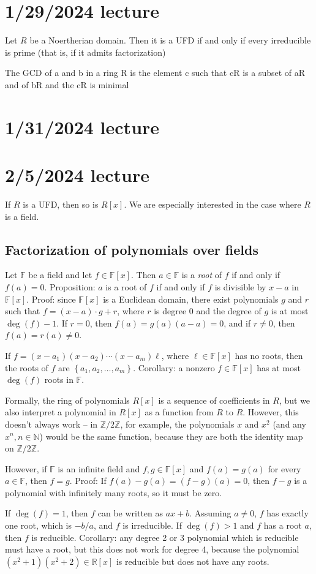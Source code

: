 \documentclass[12pt]{article}
\begin{document}
\section{1/29/2024 lecture}
Let $R$ be a Noertherian domain. Then it is a UFD if and only if every irreducible is prime (that is, if it admits factorization)
\par
The GCD of a and b in a ring R is the element c such that cR is a subset of aR and of bR and the cR is minimal
\section{1/31/2024 lecture}

\section{2/5/2024 lecture}
If $R$ is a UFD, then so is $R[x]$. We are especially interested in the case where $R$ is a field.
\subsection{Factorization of polynomials over fields}
Let $\mathbb{F}$ be a field and let $f \in \mathbb{F}[x]$. Then $a \in \mathbb{F}$ is a \textit{root} of $f$ if and only if $f(a)=0$. Proposition: $a$ is a root of $f$ if and only if $f$ is divisible by $x-a$ in $\mathbb{F}[x]$. Proof: since $\mathbb{F}[x]$ is a Euclidean domain, there exist polynomials $g$ and $r$ such that $f=(x-a)\cdot g + r$, where $r$ is degree 0 and the degree of $g$ is at most $\operatorname{deg}(f)-1$. If $r=0$, then $f(a)=g(a)(a-a)=0$, and if $r \neq 0$, then $f(a)=r(a)\neq0$.
\par
If $f = (x-a_1)(x-a_2)\cdots (x-a_m) \ell$, where $\ell \in \mathbb{F}[x]$ has no roots, then the roots of $f$ are $ \left\{ a_1, a_2, \dots, a_m \right\}$. Corollary: a nonzero $f \in \mathbb{F}[x]$ has at most $\operatorname{deg}(f)$ roots in $\mathbb{F}$.
\par
Formally, the ring of polynomials $R[x]$ is a sequence of coefficients in $R$, but we also interpret a polynomial in $R[x]$ as a function from $R$ to $R$. However, this doesn't always work -- in $\mathbb{Z}/2\mathbb{Z}$, for example, the polynomials $x$ and $x^2$ (and any $x^n, n \in \mathbb{N}$) would be the same function, because they are both the identity map on $\mathbb{Z}/2\mathbb{Z}$.
\par
However, if $\mathbb{F}$ is an infinite field and $f,g \in \mathbb{F}[x]$ and $f(a)=g(a)$ for every $a \in \mathbb{F}$, then $f=g$. Proof: If $f(a)-g(a)=(f-g)(a)=0$, then $f-g$ is a polynomial with infinitely many roots, so it must be zero.
\par
If $\operatorname{deg}(f)=1$, then $f$ can be written as $ax+b$. Assuming $a \neq 0$, $f$ has exactly one root, which is $-b/a$, and $f$ is irreducible. If $\operatorname{deg}(f) > 1$ and $f$ has a root $a$, then $f$ is reducible. Corollary: any degree 2 or 3 polynomial which is reducible must have a root, but this does not work for degree 4, because the polynomial $(x^2+1)(x^2+2) \in \mathbb{R}[x]$ is reducible but does not have any roots.
\end{document}
